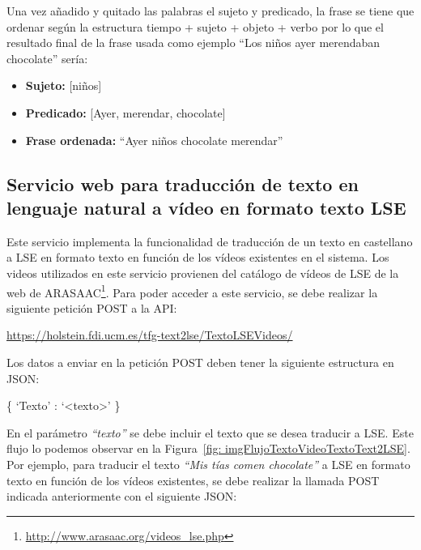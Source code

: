 Una vez añadido y quitado las palabras el sujeto y predicado, la frase se tiene que ordenar según la estructura tiempo + sujeto + objeto + verbo por lo que el resultado final de la frase usada como ejemplo ``Los niños ayer merendaban chocolate'' sería: 

\begin{center}
	\begin{itemize}
		\item \textbf{Sujeto:}  [niños]
		\item \textbf{Predicado:} [Ayer, merendar, chocolate]
		\item \textbf{Frase ordenada:} ``Ayer niños chocolate merendar'' 
		
		
	\end{itemize}
\end{center}


\subsection{Servicio web para traducción de texto en lenguaje natural a vídeo en formato texto LSE }
\label{cap5:sec:textoLSEvideo}

Este servicio implementa la funcionalidad de traducción de un texto en castellano a LSE en formato texto en función de los vídeos existentes en el sistema. Los videos utilizados en este servicio provienen del catálogo de vídeos de LSE de la web de ARASAAC\footnote{\url{http://www.arasaac.org/videos_lse.php}}. Para poder acceder a este servicio, se debe realizar la siguiente petición POST a la API:\\

\begin{shaded}
	\url{https://holstein.fdi.ucm.es/tfg-text2lse/TextoLSEVideos/  }	
\end{shaded}


Los datos a enviar en la petición POST deben tener la siguiente estructura en JSON: 
\begin{center}
	
	\{ `Texto' : `<texto>' \}
	
\end{center}


En el parámetro \textit{``texto''} se debe incluir el texto que se desea traducir a LSE. Este flujo lo podemos observar en la Figura~\ref {fig: imgFlujoTextoVideoTextoText2LSE}.\\

Por ejemplo, para traducir el texto \textit{``Mis tías comen chocolate''} a LSE en formato texto en función de los vídeos existentes, se debe realizar la llamada POST indicada anteriormente con el siguiente JSON:


